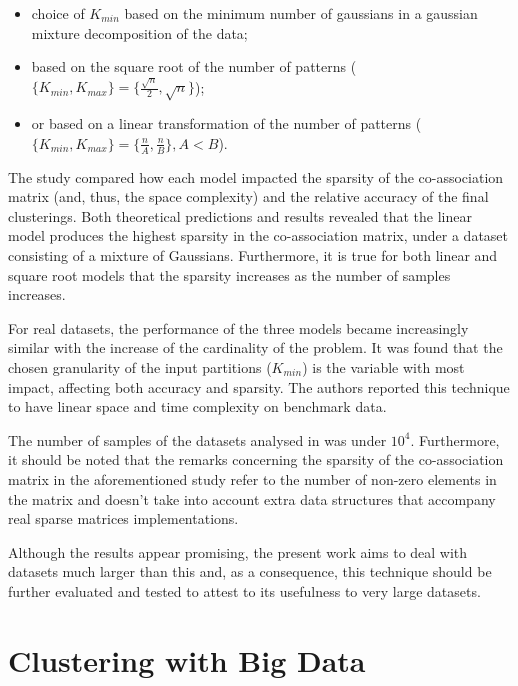 \begin{itemize}
	\item choice of $K_{min}$ based on the minimum number of gaussians in a gaussian mixture decomposition of the data;
	\item based on the square root of the number of patterns ($\{K_{min},K_{max}\} = \{\frac{\sqrt{n}}{2},\sqrt{n}\}$);
	\item or based on a linear transformation of the number of patterns ($\{K_{min},K_{max}\} = \{\frac{n}{A},\frac{n}{B}\},A<B$).
\end{itemize}

The study compared how each model impacted the sparsity of the co-association matrix (and, thus, the space complexity) and the relative accuracy of the final clusterings.
Both theoretical predictions and results revealed that the linear model produces the highest sparsity in the co-association matrix, under a dataset consisting of a mixture of Gaussians.
Furthermore, it is true for both linear and square root models that the sparsity increases as the number of samples increases.

For real datasets, the performance of the three models became increasingly similar with the increase of the cardinality of the problem.
It was found that the chosen granularity of the input partitions ($K_{min}$) is the variable with most impact, affecting both accuracy and sparsity.
The authors reported this technique to have linear space and time complexity on benchmark data.

The number of samples of the datasets analysed in \cite{Lourenco2010} was under $10^4$.
Furthermore, it should be noted that the remarks concerning the sparsity of the co-association matrix in the aforementioned study refer to the number of non-zero elements in the matrix and doesn't take into account extra data structures that accompany real sparse matrices implementations.

Although the results appear promising, the present work aims to deal with datasets much larger than this and, as a consequence, this technique should be further evaluated and tested to attest to its usefulness to very large datasets. %

\section{Clustering with Big Data}
\label{sec:big data}

